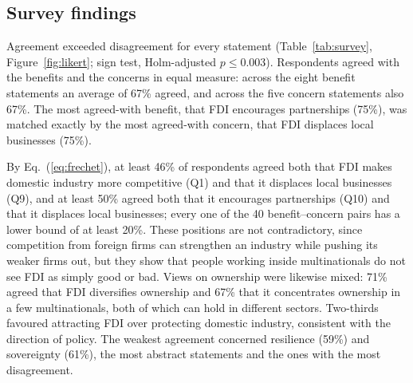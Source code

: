 \documentclass[sn-basic]{sn-jnl}
\begin{document}
\subsection{Survey findings}

Agreement exceeded disagreement for every statement (Table~\ref{tab:survey}, Figure~\ref{fig:likert}; sign test, Holm-adjusted $p \leq 0.003$). Respondents agreed with the benefits and the concerns in equal measure: across the eight benefit statements an average of 67\% agreed, and across the five concern statements also 67\%. The most agreed-with benefit, that FDI encourages partnerships (75\%), was matched exactly by the most agreed-with concern, that FDI displaces local businesses (75\%).

By Eq.~(\ref{eq:frechet}), at least 46\% of respondents agreed both that FDI makes domestic industry more competitive (Q1) and that it displaces local businesses (Q9), and at least 50\% agreed both that it encourages partnerships (Q10) and that it displaces local businesses; every one of the 40 benefit--concern pairs has a lower bound of at least 20\%. These positions are not contradictory, since competition from foreign firms can strengthen an industry while pushing its weaker firms out, but they show that people working inside multinationals do not see FDI as simply good or bad. Views on ownership were likewise mixed: 71\% agreed that FDI diversifies ownership and 67\% that it concentrates ownership in a few multinationals, both of which can hold in different sectors. Two-thirds favoured attracting FDI over protecting domestic industry, consistent with the direction of policy. The weakest agreement concerned resilience (59\%) and sovereignty (61\%), the most abstract statements and the ones with the most disagreement.
\end{document}
